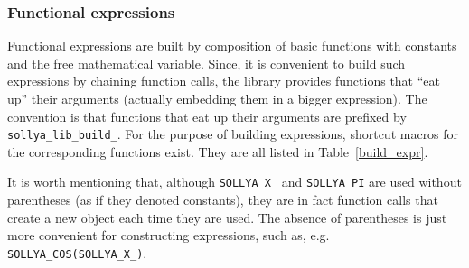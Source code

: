 \documentclass[a4paper]{article}
\begin{document}
\subsubsection{Functional expressions}
Functional expressions are built by composition of basic functions with constants and the free mathematical variable. Since, it is convenient to build such expressions by chaining function calls, the library provides functions that ``eat up'' their arguments (actually embedding them in a bigger expression). The convention is that functions that eat up their arguments are prefixed by \texttt{sollya\_lib\_build\_}. For the purpose of building expressions, shortcut macros for the corresponding functions exist. They are all listed in Table~\ref{build_expr}.

It is worth mentioning that, although \texttt{SOLLYA\_X\_} and \texttt{SOLLYA\_PI} are used without parentheses (as if they denoted constants), they are in fact function calls that create a new object each time they are used. The absence of parentheses is just more convenient for constructing expressions, such as, e.g. \texttt{SOLLYA\_COS(SOLLYA\_X\_)}.
\end{document}
